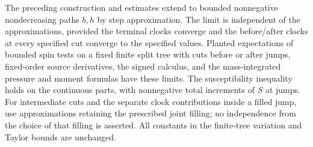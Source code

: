 \begin{proposition}\label{prop:found-limits}
The preceding construction and estimates extend to bounded nonnegative
nondecreasing paths $b,h$ by step approximation. The limit is independent
of the approximations, provided the terminal clocks converge and the
before/after clocks at every specified cut converge to the specified
values. Planted expectations of bounded spin tests on a fixed finite
split tree with cuts before or after jumps, fixed-order source derivatives,
the signed calculus, and the mass-integrated pressure and moment formulas
have these limits. The susceptibility inequality holds on the continuous
parts, with nonnegative total increments of $S$ at jumps. For intermediate
cuts and the separate clock contributions inside a filled jump, use
approximations retaining the prescribed joint filling; no independence
from the choice of that filling is asserted. All constants in
the finite-tree variation and Taylor bounds are unchanged.
\end{proposition}

